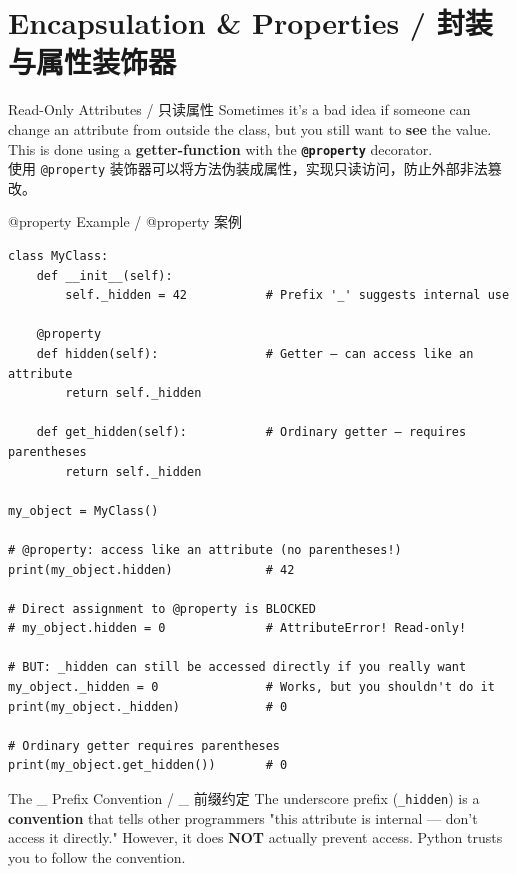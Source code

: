 \documentclass[11pt,a4paper]{article}
\begin{document}
\section{Encapsulation \& Properties / 封装与属性装饰器}

\begin{concept}{Read-Only Attributes / 只读属性}
    Sometimes it's a bad idea if someone can change an attribute from outside the class, but you still want to \textbf{see} the value. This is done using a \textbf{getter-function} with the \textbf{\texttt{@property}} decorator. \\
    使用 \texttt{@property} 装饰器可以将方法伪装成属性，实现只读访问，防止外部非法篡改。
\end{concept}

\begin{examplebox}{@property Example / @property 案例}
\begin{lstlisting}
class MyClass:
    def __init__(self):
        self._hidden = 42           # Prefix '_' suggests internal use

    @property
    def hidden(self):               # Getter — can access like an attribute
        return self._hidden

    def get_hidden(self):           # Ordinary getter — requires parentheses
        return self._hidden

my_object = MyClass()

# @property: access like an attribute (no parentheses!)
print(my_object.hidden)             # 42

# Direct assignment to @property is BLOCKED
# my_object.hidden = 0              # AttributeError! Read-only!

# BUT: _hidden can still be accessed directly if you really want
my_object._hidden = 0               # Works, but you shouldn't do it
print(my_object._hidden)            # 0

# Ordinary getter requires parentheses
print(my_object.get_hidden())       # 0
\end{lstlisting}
\end{examplebox}

\begin{warning}{The \_ Prefix Convention / \_ 前缀约定}
    The underscore prefix (\texttt{\_hidden}) is a \textbf{convention} that tells other programmers "this attribute is internal — don't access it directly." However, it does \textbf{NOT} actually prevent access. Python trusts you to follow the convention.
\end{warning}
\end{document}
